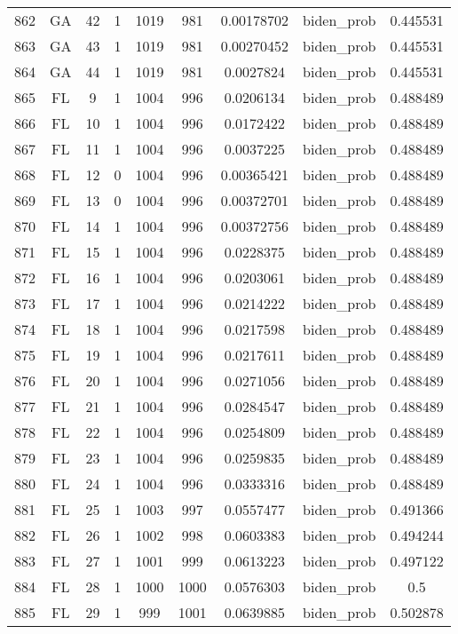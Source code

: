 \documentclass[12pt,a4paper]{article}
\begin{document}
\begin{tabular}{r|cccccccc}
	862 & GA & 42 & 1 & 1019 & 981 & 0.00178702 & biden\_prob & 0.445531 \\
	863 & GA & 43 & 1 & 1019 & 981 & 0.00270452 & biden\_prob & 0.445531 \\
	864 & GA & 44 & 1 & 1019 & 981 & 0.0027824 & biden\_prob & 0.445531 \\
	865 & FL & 9 & 1 & 1004 & 996 & 0.0206134 & biden\_prob & 0.488489 \\
	866 & FL & 10 & 1 & 1004 & 996 & 0.0172422 & biden\_prob & 0.488489 \\
	867 & FL & 11 & 1 & 1004 & 996 & 0.0037225 & biden\_prob & 0.488489 \\
	868 & FL & 12 & 0 & 1004 & 996 & 0.00365421 & biden\_prob & 0.488489 \\
	869 & FL & 13 & 0 & 1004 & 996 & 0.00372701 & biden\_prob & 0.488489 \\
	870 & FL & 14 & 1 & 1004 & 996 & 0.00372756 & biden\_prob & 0.488489 \\
	871 & FL & 15 & 1 & 1004 & 996 & 0.0228375 & biden\_prob & 0.488489 \\
	872 & FL & 16 & 1 & 1004 & 996 & 0.0203061 & biden\_prob & 0.488489 \\
	873 & FL & 17 & 1 & 1004 & 996 & 0.0214222 & biden\_prob & 0.488489 \\
	874 & FL & 18 & 1 & 1004 & 996 & 0.0217598 & biden\_prob & 0.488489 \\
	875 & FL & 19 & 1 & 1004 & 996 & 0.0217611 & biden\_prob & 0.488489 \\
	876 & FL & 20 & 1 & 1004 & 996 & 0.0271056 & biden\_prob & 0.488489 \\
	877 & FL & 21 & 1 & 1004 & 996 & 0.0284547 & biden\_prob & 0.488489 \\
	878 & FL & 22 & 1 & 1004 & 996 & 0.0254809 & biden\_prob & 0.488489 \\
	879 & FL & 23 & 1 & 1004 & 996 & 0.0259835 & biden\_prob & 0.488489 \\
	880 & FL & 24 & 1 & 1004 & 996 & 0.0333316 & biden\_prob & 0.488489 \\
	881 & FL & 25 & 1 & 1003 & 997 & 0.0557477 & biden\_prob & 0.491366 \\
	882 & FL & 26 & 1 & 1002 & 998 & 0.0603383 & biden\_prob & 0.494244 \\
	883 & FL & 27 & 1 & 1001 & 999 & 0.0613223 & biden\_prob & 0.497122 \\
	884 & FL & 28 & 1 & 1000 & 1000 & 0.0576303 & biden\_prob & 0.5 \\
	885 & FL & 29 & 1 & 999 & 1001 & 0.0639885 & biden\_prob & 0.502878 \\

\end{tabular}
\end{document}
